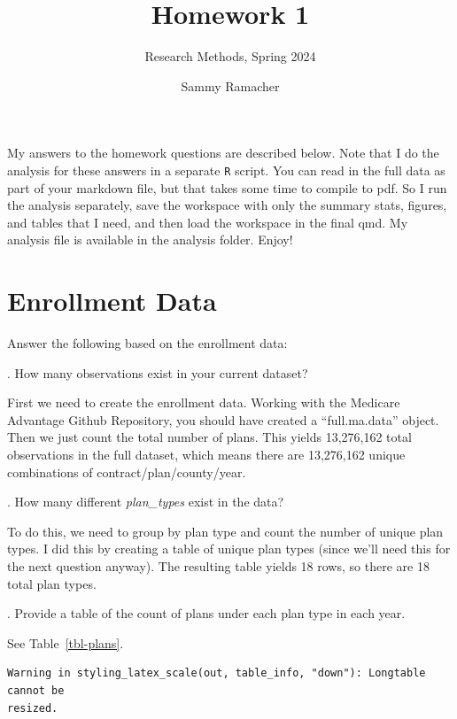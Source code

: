 \documentclass[
  letterpaper,
  DIV=11,
  numbers=noendperiod]{scrartcl}
\title{Homework 1}
\subtitle{Research Methods, Spring 2024}
\author{Sammy Ramacher}
\date{}
\begin{document}
\maketitle

My answers to the homework questions are described below. Note that I do
the analysis for these answers in a separate \texttt{R} script. You can
read in the full data as part of your markdown file, but that takes some
time to compile to pdf. So I run the analysis separately, save the
workspace with only the summary stats, figures, and tables that I need,
and then load the workspace in the final qmd. My analysis file is
available in the analysis folder. Enjoy!

\newpage

\section{Enrollment Data}\label{enrollment-data}

Answer the following based on the enrollment data:

\vspace{.2in}

. How many observations exist in your current dataset?

First we need to create the enrollment data. Working with the Medicare
Advantage Github Repository, you should have created a ``full.ma.data''
object. Then we just count the total number of plans. This yields
13,276,162 total observations in the full dataset, which means there are
13,276,162 unique combinations of contract/plan/county/year.

\newpage

. How many different \emph{plan\_types} exist in the data?

To do this, we need to group by plan type and count the number of unique
plan types. I did this by creating a table of unique plan types (since
we'll need this for the next question anyway). The resulting table
yields 18 rows, so there are 18 total plan types.

\newpage

. Provide a table of the count of plans under each plan type
in each year.

See Table~\ref{tbl-plans}.

\begin{verbatim}
Warning in styling_latex_scale(out, table_info, "down"): Longtable cannot be
resized.
\end{verbatim}
\end{document}
